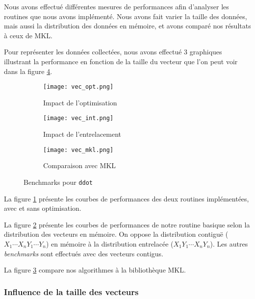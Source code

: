 Nous avons effectué différentes mesures de performances afin d'analyser les routines que nous avons implémenté. Nous avons fait varier la taille des données, mais aussi la distribution des données en mémoire, et avons comparé nos résultats à ceux de MKL.

Pour représenter les données collectées, nous avons effectué 3 graphiques illustrant la performance en fonction de la taille du vecteur que l'on peut voir dans la figure \ref{fig:graph_vec}.

\begin{figure}[ht]
\centering
\begin{subfigure}[b]{.5\textwidth}
  \centering
  \texttt{[image: vec\_opt.png]}
  \caption{Impact de l'optimisation}
  \label{fig:vec_opt}
\end{subfigure}%
\begin{subfigure}[b]{.5\textwidth}
  \centering
  \texttt{[image: vec\_int.png]}
  \caption{Impact de l'entrelacement}
  \label{fig:vec_int}
\end{subfigure}
\begin{subfigure}[b]{.5\textwidth}
  \centering
  \texttt{[image: vec\_mkl.png]}
  \caption{Comparaison avec MKL}
  \label{fig:vec_mkl}
\end{subfigure}
\caption{Benchmarks pour \texttt{ddot}}
\label{fig:graph_vec}
\end{figure}

La figure \ref{fig:vec_opt} présente les courbes de performances des deux routines implémentées, avec et sans optimisation. 

La figure \ref{fig:vec_int} présente les courbes de performances de notre routine basique selon la distribution des vecteurs en mémoire. On oppose la distribution contiguë ($X_1\cdots X_nY_1\cdots Y_n$) en mémoire à la distribution entrelacée ($X_1Y_1\cdots X_nY_n$). Les autres \emph{benchmarks} sont effectués avec des vecteurs contigus.

La figure \ref{fig:vec_mkl} compare nos algorithmes à la bibliothèque MKL.

\subsubsection{Influence de la taille des vecteurs}

